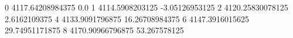 0 4117.64208984375 0.0
1 4114.5908203125 -3.05126953125
2 4120.25830078125 2.6162109375
4 4133.9091796875 16.26708984375
6 4147.3916015625 29.74951171875
8 4170.90966796875 53.267578125
